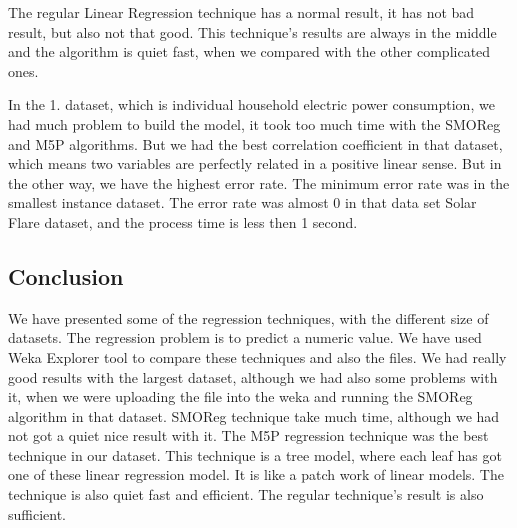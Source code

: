 \documentclass[a4paper]{article}
\begin{document}
The regular Linear Regression technique has a normal result, it has not bad result, but also not that good. This technique's results are always in the middle and the algorithm is quiet fast, when we compared with the other complicated ones.

In the 1. dataset, which is individual household electric power consumption, we had much problem to build the model, it took too much time with the SMOReg and M5P algorithms. But we had the best correlation coefficient in that dataset, which means two variables are perfectly related in a positive linear sense. But in the other way, we have the highest error rate. The minimum error rate was in the smallest instance dataset. The error rate was almost 0 in that data set Solar Flare dataset, and the process time is less then 1 second.


\subsection{Conclusion}

We have presented some of the regression techniques, with the different size of datasets. The regression problem is to predict a numeric value. We have used Weka Explorer tool to compare these techniques and also the files. We had really good results with the largest dataset, although we had also some problems with it, when we were uploading the file into the weka and running the SMOReg algorithm in that dataset. SMOReg technique take much time, although we had not got a quiet nice result with it. The M5P regression technique was the best technique in our dataset. This technique is a tree model, where each leaf has got one of these linear regression model. It is like a patch work of linear models. The technique is also quiet fast and efficient. The regular technique's result is also sufficient. 
\end{document}
